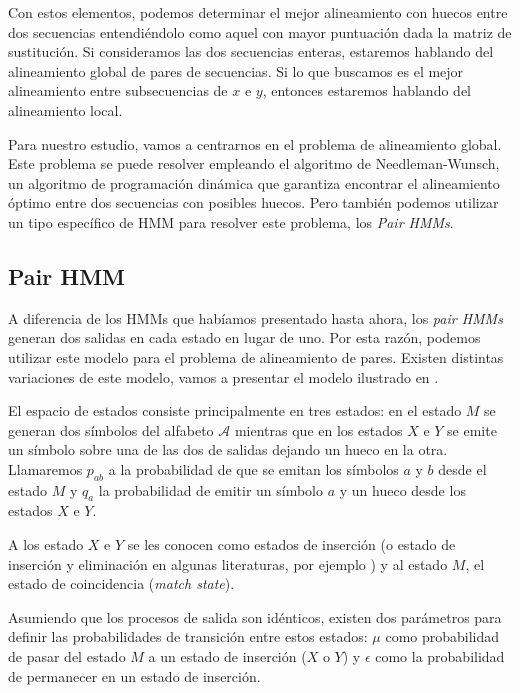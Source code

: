 Con estos elementos, podemos determinar el mejor alineamiento con huecos entre dos secuencias entendiéndolo como aquel con mayor puntuación dada la matriz de sustitución. Si consideramos las dos secuencias enteras, estaremos hablando del alineamiento global de pares de secuencias. Si lo que buscamos es el mejor alineamiento entre subsecuencias de $x$ e $y$, entonces estaremos hablando del alineamiento local.

Para nuestro estudio, vamos a centrarnos en el problema de alineamiento global. Este problema se puede resolver empleando el algoritmo de Needleman-Wunsch, un algoritmo de programación dinámica que garantiza encontrar el alineamiento óptimo entre dos secuencias con posibles huecos. Pero también podemos utilizar un tipo específico de HMM para resolver este problema, los \textit{Pair HMMs}.

\subsection{Pair HMM}
A diferencia de los HMMs que habíamos presentado hasta ahora, los \textit{pair HMMs} generan dos salidas en cada estado en lugar de uno. Por esta razón, podemos utilizar este modelo para el problema de alineamiento de pares. Existen distintas variaciones de este modelo, vamos a presentar el modelo ilustrado en \cite{Durbin}. 


El espacio de estados consiste principalmente en tres estados: en el estado $M$ se generan dos símbolos del alfabeto $\mathcal{A}$ mientras que en los estados $X$ e $Y$ se emite un símbolo sobre una de las dos de salidas dejando un hueco en la otra. Llamaremos $p_{ab}$ a la probabilidad de que se emitan los símbolos $a$ y $b$ desde el estado $M$ y $q_{a}$ la probabilidad de emitir un símbolo $a$ y un hueco desde los estados $X$ e $Y$.

A los estado $X$ e $Y$ se les conocen como estados de inserción (o estado de inserción y eliminación en algunas literaturas, por ejemplo \cite{Marina}) y al estado $M$, el estado de coincidencia (\textit{match state}). 


Asumiendo que los procesos de salida son idénticos, existen dos parámetros para definir las probabilidades de transición entre estos estados: $\mu$ como probabilidad de pasar del estado $M$ a un estado de inserción ($X$ o $Y$) y $\epsilon$ como la probabilidad de permanecer en un estado de inserción.


